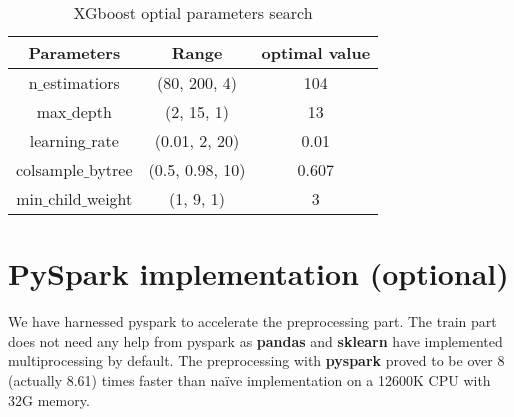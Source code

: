 \documentclass{article}
\begin{document}
    \begin{table}[htb]
        \centering
        \caption{XGboost optial parameters search}
        \label{tab:table2}
        \begin{tabular}{|c|c|c|}
            \hline
            {Parameters}          & {Range}           & {optimal value} \\
            \hline
            { n$\_$estimatiors}      & {(80, 200, 4)}    & {104}           \\
            \hline
            { max$\_$depth }         & {(2, 15, 1)}      & {13}            \\
            \hline
            {  learning$\_$rate  }       & {(0.01, 2, 20)}   & {0.01}          \\
            \hline
            {  colsample$\_$bytree}    & {(0.5, 0.98, 10)} & { 0.607 }       \\
            \hline
            {  min$\_$child$\_$weight  } & {(1, 9, 1)}       & {3}             \\
            \hline
        \end{tabular}
    \end{table}


    \section{PySpark implementation (optional)}\label{sec:pyspark-implementation-(optional)}
    We have harnessed pyspark to accelerate the preprocessing part.
    The train part does not need any help from pyspark as \textbf{pandas} and \textbf{sklearn} have implemented multiprocessing by default.
	The preprocessing with \textbf{pyspark} proved to be over 8 (actually 8.61) times faster than naïve implementation on a 12600K CPU with 32G memory.
\end{document}
